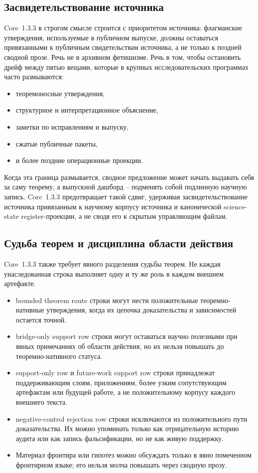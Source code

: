 \subsection{Засвидетельствование источника}

Core~1.3.3 в строгом смысле строится с приоритетом источника: флагманские
утверждения, используемые в публичном выпуске, должны оставаться привязанными
к публичным свидетельствам источника, а не только к поздней сводной прозе.
Речь не в архивном фетишизме. Речь в том, чтобы остановить дрейф между пятью
вещами, которые в крупных исследовательских программах часто размываются:

\begin{itemize}
\item теоремоносные утверждения,
\item структурное и интерпретационное объяснение,
\item заметки по исправлениям и выпуску,
\item сжатые публичные пакеты,
\item и более поздние операционные проекции.
\end{itemize}

Когда эта граница размывается, сводное предложение может начать выдавать себя
за саму теорему, а выпускной дашборд -- подменять собой подлинную научную
запись. Core~1.3.3 предотвращает такой сдвиг, удерживая засвидетельствование
источника привязанным к научному корпусу источника и канонической
science-state register-проекции, а не сводя его к скрытым управляющим файлам.

\subsection{Судьба теорем и дисциплина области действия}

Core~1.3.3 также требует явного разделения судьбы теорем. Не каждая унаследованная
строка выполняет одну и ту же роль в каждом внешнем артефакте.

\begin{itemize}
\item bounded theorem route строки могут нести положительные
      теоремно-нативные утверждения, когда их цепочка доказательства и
      зависимостей остается точной.
\item bridge-only support row строки могут оставаться научно полезными при явных
      примечаниях об области действия, но их нельзя повышать до
      теоремно-нативного статуса.
\item support-only row и future-work support row строки принадлежат
      поддерживающим слоям, приложениям, более узким сопутствующим артефактам
      или будущей работе, а не положительному корпусу каждого внешнего текста.
\item negative-control rejection row строки исключаются из положительного пути доказательства.
      Их можно упоминать только как отрицательную историю аудита или как запись
      фальсификации, но не как живую поддержку.
\item Материал фронтира или гипотез можно обсуждать только в явно помеченном
      фронтирном языке; его нельзя молча повышать через сводную прозу.
\end{itemize}


